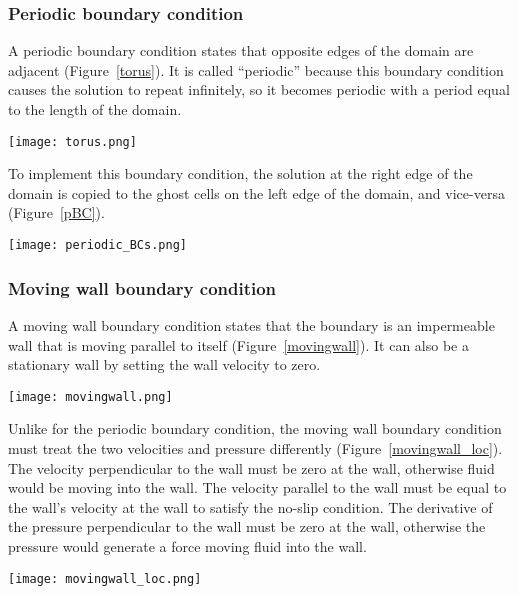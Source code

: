 \documentclass[12pt]{article}
\begin{document}
\subsubsection{Periodic boundary condition}
\label{periodicBCs}
A periodic boundary condition states that opposite edges of the domain are adjacent (Figure~\ref{torus}).  It is called ``periodic'' because this boundary condition causes the solution to repeat infinitely, so it becomes periodic with a period equal to the length of the domain.
\begin{center}
\begin{figure*}
\center
\texttt{[image: torus.png]} 
\caption{Schematic of periodic domain.}
\label{torus}
\end{figure*}
\end{center}

To implement this boundary condition, the solution at the right edge of the domain is copied to the ghost cells on the left edge of the domain, and vice-versa (Figure~\ref{pBC}).
\begin{center}
\begin{figure*}
\center
\texttt{[image: periodic\_BCs.png]} 
\caption{How to fill periodic BCs.}
\label{pBC}
\end{figure*}
\end{center}  

\subsubsection{Moving wall boundary condition}
A moving wall boundary condition states that the boundary is an impermeable wall that is moving parallel to itself (Figure~\ref{movingwall}).  It can also be a stationary wall by setting the wall velocity to zero.
\begin{center}
\begin{figure*}
\center
\texttt{[image: movingwall.png]} 
\caption{Schematic of moving wall domain.}
\label{movingwall}
\end{figure*}
\end{center}


Unlike for the periodic boundary condition, the moving wall boundary condition must treat the two velocities and pressure differently (Figure~\ref{movingwall_loc}).  The velocity perpendicular to the wall must be zero at the wall, otherwise fluid would be moving into the wall.  The velocity parallel to the wall must be equal to the wall's velocity at the wall to satisfy the no-slip condition.  The derivative of the pressure perpendicular to the wall must be zero at the wall, otherwise the pressure would generate a force moving fluid into the wall.
\begin{center}
\begin{figure*}
\center
\texttt{[image: movingwall\_loc.png]} 
\caption{Schematic of moving wall boundary condition locations.}
\label{movingwall_loc}
\end{figure*}
\end{center}
\end{document}
